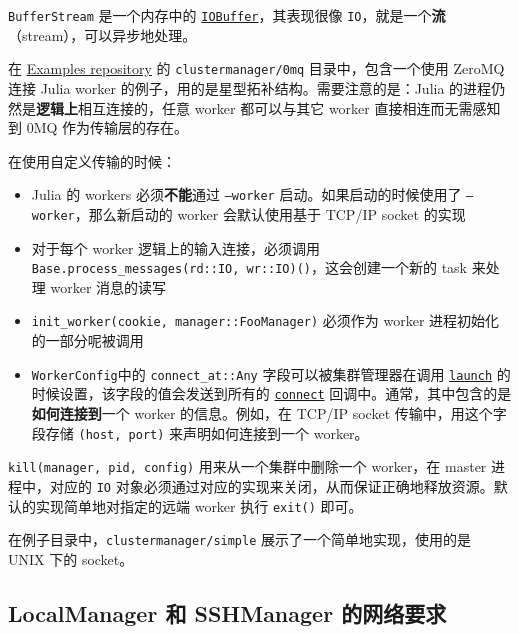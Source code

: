 \texttt{BufferStream} 是一个内存中的 \hyperlink{15789326112236459498}{\texttt{IOBuffer}}，其表现很像 \texttt{IO}，就是一个\textbf{流}（stream），可以异步地处理。



在 \href{https://github.com/JuliaAttic/Examples}{Examples repository} 的 \texttt{clustermanager/0mq} 目录中，包含一个使用 ZeroMQ 连接 Julia worker 的例子，用的是星型拓补结构。需要注意的是：Julia 的进程仍然是\textbf{逻辑上}相互连接的，任意 worker 都可以与其它 worker 直接相连而无需感知到 0MQ 作为传输层的存在。



在使用自定义传输的时候：



\begin{itemize}
\item Julia 的 workers 必须\textbf{不能}通过 \texttt{--worker} 启动。如果启动的时候使用了 \texttt{--worker}，那么新启动的 worker 会默认使用基于 TCP/IP socket 的实现


\item 对于每个 worker 逻辑上的输入连接，必须调用 \texttt{Base.process\_messages(rd::IO, wr::IO)()}，这会创建一个新的 task 来处理 worker 消息的读写


\item \texttt{init\_worker(cookie, manager::FooManager)} 必须作为 worker 进程初始化的一部分呢被调用


\item \texttt{WorkerConfig}中的 \texttt{connect\_at::Any} 字段可以被集群管理器在调用 \hyperlink{7346188534454273843}{\texttt{launch}} 的时候设置，该字段的值会发送到所有的 \hyperlink{5152827542417649360}{\texttt{connect}} 回调中。通常，其中包含的是\textbf{如何连接到}一个 worker 的信息。例如，在 TCP/IP socket 传输中，用这个字段存储 \texttt{(host, port)} 来声明如何连接到一个 worker。

\end{itemize}


\texttt{kill(manager, pid, config)} 用来从一个集群中删除一个 worker，在 master 进程中，对应的 \texttt{IO} 对象必须通过对应的实现来关闭，从而保证正确地释放资源。默认的实现简单地对指定的远端 worker 执行 \texttt{exit()} 即可。



在例子目录中，\texttt{clustermanager/simple} 展示了一个简单地实现，使用的是 UNIX 下的 socket。



\hypertarget{6223669855960438168}{}


\subsection{LocalManager 和 SSHManager 的网络要求}



